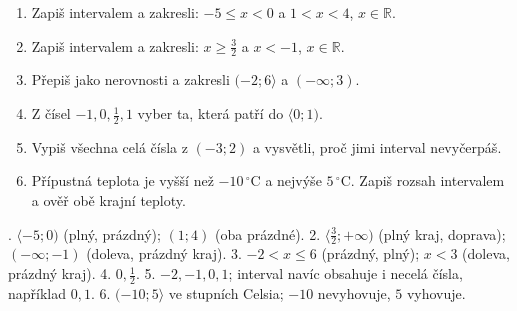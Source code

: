 \documentclass[11pt,a4paper]{article}
\begin{document}
\begin{zadaniReseniBox}[title={Domácí úkol},breakable=false]
\begin{enumerate}[label=\arabic*)]
\item Zapiš intervalem a zakresli: $-5\le x<0$ a $1<x<4$, $x\in\mathbb R$.
\item Zapiš intervalem a zakresli: $x\ge\frac32$ a $x<-1$, $x\in\mathbb R$.
\item Přepiš jako nerovnosti a zakresli $(-2;6\rangle$ a $(-\infty;3)$.
\item Z čísel $-1,0,\frac12,1$ vyber ta, která patří do $\langle0;1)$.
\item Vypiš všechna celá čísla z $(-3;2)$ a vysvětli, proč jimi interval nevyčerpáš.
\item Přípustná teplota je vyšší než $-10\,^{\circ}\mathrm C$ a nejvýše
$5\,^{\circ}\mathrm C$. Zapiš rozsah intervalem a ověř obě krajní teploty.
\end{enumerate}
. $\langle-5;0)$ (plný, prázdný); $(1;4)$ (oba prázdné).
2. $\langle\frac32;+\infty)$ (plný kraj, doprava);
$(-\infty;-1)$ (doleva, prázdný kraj).
3. $-2<x\le6$ (prázdný, plný); $x<3$ (doleva, prázdný kraj).
4. $0,\frac12$.
5. $-2,-1,0,1$; interval navíc obsahuje i necelá čísla, například $0{,}1$.
6. $(-10;5\rangle$ ve stupních Celsia; $-10$ nevyhovuje, $5$ vyhovuje.
\end{zadaniReseniBox}
\end{document}

